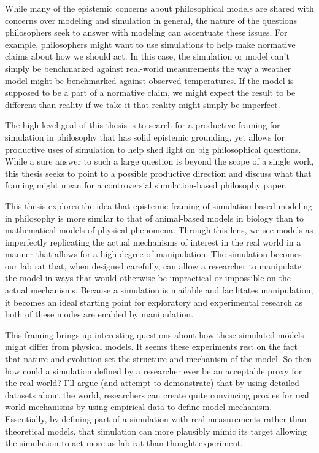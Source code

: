While many of the epistemic concerns about philosophical models are
shared with concerns over modeling and simulation in general, the nature
of the questions philosophers seek to answer with modeling can
accentuate these issues. For example, philosophers might want to use
simulations to help make normative claims about how we should act. In
this case, the simulation or model can't simply be benchmarked against
real-world measurements the way a weather model might be benchmarked
against observed temperatures. If the model is supposed to be a part of
a normative claim, we might expect the result to be different than
reality if we take it that reality might simply be imperfect.

The high level goal of this thesis is to search for a productive framing
for simulation in philosophy that has solid epistemic grounding, yet
allows for productive uses of simulation to help shed light on big
philosophical questions. While a sure answer to such a large question is
beyond the scope of a single work, this thesis seeks to point to a
possible productive direction and discuss what that framing might mean
for a controversial simulation-based philosophy paper.

This thesis explores the idea that epistemic framing of simulation-based
modeling in philosophy is more similar to that of animal-based models in
biology than to mathematical models of physical phenomena. Through this
lens, we see models as imperfectly replicating the actual mechanisms of
interest in the real world in a manner that allows for a high degree of
manipulation. The simulation becomes our lab rat that, when designed
carefully, can allow a researcher to manipulate the model in ways that
would otherwise be impractical or impossible on the actual mechanisms.
Because a simulation is mailable and facilitates manipulation, it
becomes an ideal starting point for exploratory and experimental
research as both of these modes are enabled by manipulation.

This framing brings up interesting questions about how these simulated
models might differ from physical models. It seems these experiments
rest on the fact that nature and evolution set the structure and
mechanism of the model. So then how could a simulation defined by a
researcher ever be an acceptable proxy for the real world? I'll argue
(and attempt to demonstrate) that by using detailed datasets about the
world, researchers can create quite convincing proxies for real world
mechanisms by using empirical data to define model mechanism.
Essentially, by defining part of a simulation with real measurements
rather than theoretical models, that simulation can more plausibly mimic
its target allowing the simulation to act more as lab rat than thought
experiment.

